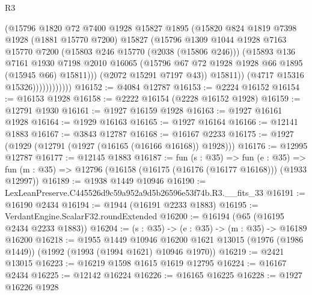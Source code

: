 \begin{lexlean}{R3}
\begin{coremodule}
                            (@15796
                              @1820
                              @72
                              @7400
                              @1928
                              @15827
                              @1895
                              (@15820
                                @824
                                @1819
                                @7398
                                @1928
                                (@1881 @15770 @7200)
                                @15827
                                (@15796
                                  @1309
                                  @1044
                                  @1928
                                  @7163
                                  @15770
                                  @7200
                                  (@15803 @246 @15770 (@2038 (@15806 @246)))
                                  (@15893
                                    @136
                                    @7161
                                    @1930
                                    @7198
                                    @2010
                                    @16065
                                    (@15796 @67 @72 @1928 @1928 @66 @1895 (@15945 @66) @15811)))
                                (@2072 @15291 @7197 @43))
                              @15811))
                          (@4717 @15316 @15326))))))))))))
@16152 := @4084 @12787
@16153 := @2224 @16152
@16154 := @16153 @1928
@16158 := @2222 @16154 (@2228 @16152 @1928)
@16159 := @12791 @1930
@16161 := @1927 @16159 @1928
@16163 := @1927 @16161 @1928
@16164 := @1929 @16163
@16165 := @1927 @16164
@16166 := @12141 @1883
@16167 := @3843 @12787
@16168 := @16167 @2233
@16175 := @1927 (@1929 (@12791 (@1927 (@16165 (@16166 @16168)) @1928)))
@16176 := @12995 @12787
@16177 := @12145 @1883
@16187 := fun (s : @35) =>
  fun (e : @35) => fun (m : @35) => @12796 (@16158 (@16175 (@16176 (@16177 @16168))) (@1933 @12997))
@16189 := @1938 @1449 @10946
@16190 := LexLeanPreserve.C445526d9c59a952a9d5b26596e53f74b.R3.__fits_33
@16191 := @16190 @2434
@16194 := @1944 (@16191 @2233 @1883)
@16195 := VerdantEngine.ScalarF32.roundExtended
@16200 := @16194 (@65 (@16195 @2434 @2233 @1883))
@16204 := (s : @35) -> (e : @35) -> (m : @35) -> @16189 @16200
@16218 := @1955
    @1449
    @10946
    @16200
    @1621
    @13015
    (@1976 (@1986 @1449))
    (@1992 (@1993 (@1994 @1621) @10946 @1970))
@16219 := @2421 @13015
@16223 := @16219 @1598 @1615 @1619 @12795
@16224 := @16167 @2434
@16225 := @12142 @16224
@16226 := @16165 @16225
@16228 := @1927 @16226 @1928

\end{coremodule}
\end{lexlean}
